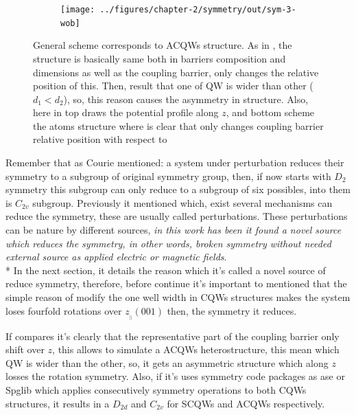 \begin{figure}[h!]
	\centering
	\begin{subfigure}{\textwidth}
	\texttt{[image: ../figures/chapter-2/symmetry/out/sym-3-wob]}
	\label{subfig:subsubsec:chapter-2-acoupled-quantum-wells-a}
	\label{subfig:subsubsec:chapter-2-acoupled-quantum-wells-b}
	\end{subfigure}
	\caption
	{General scheme corresponds to ACQWs structure.
	As in , the structure is basically same both in barriers composition and dimensions as well as the coupling barrier, only changes the relative position of this. Then, result that one of QW is wider than other ($d_{1}<d_{2}$), so, this reason causes the asymmetry in structure. Also, here in top 
	 draws the potential profile along $z$, and bottom 
	 scheme the atoms structure where is clear that only changes coupling barrier relative position with respect to 
	}\label{fig:subsubsec:chapter-2-acoupled-quantum-wells}
\end{figure}

Remember that as Courie mentioned\cite{curie1894symetrie,sep-symmetry-breaking,shubnikov1988works}:  a system under perturbation reduces their symmetry to a subgroup of  original symmetry group, then, if now starts with $D_{2}$ symmetry this subgroup can only reduce to a subgroup of six possibles, into them is $C_{2v}$ subgroup. Previously it mentioned which, exist several mechanisms can reduce the symmetry, these are usually called  perturbations. These perturbations can be nature by different sources, \emph{in this work  has been it found a novel source which reduces the symmetry,  in other words,  broken symmetry  without needed external source as applied electric or magnetic fields}.  \\*
In the next section, it details the reason which it's called  a novel source of reduce symmetry, therefore, before continue it's important to mentioned that the simple reason of modify the one well width in CQWs structures makes the system loses fourfold rotations over $z_{_{\parallel}}(001)$  then, the symmetry it reduces. 

If compares  it's clearly that the representative part of the coupling barrier only shift over $z$, this allows to simulate a \gls{ACQWs} heterostructure, this mean which QW is wider than the other, so, it gets an asymmetric structure which along $z$ losses the rotation symmetry. Also, if it's uses symmetry code packages as \gls{ase} or \gls{Spglib} which applies consecutively symmetry operations to both CQWs structures, it results in a $D_{2d}$ and $C_{2v}$ for \gls{SCQWs} and \gls{ACQWs} respectively.  
 
